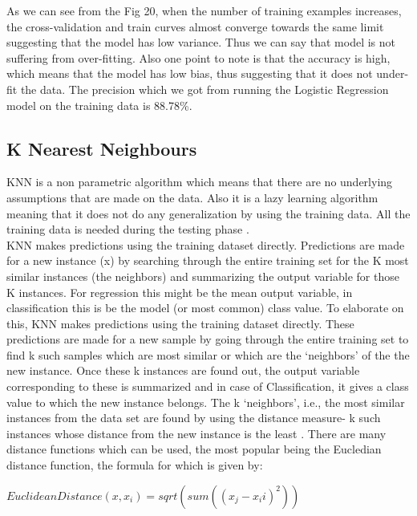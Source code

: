 As we can see from the Fig 20, when the number of training examples increases, the cross-validation and train curves almost converge towards the same limit suggesting that the model has low variance. Thus we can say that model is not suffering from over-fitting. Also one point to note is that the accuracy is high, which means that the model has low bias, thus suggesting that it does not under-fit the data. The precision which we got from running the Logistic Regression model on the training data is 88.78\%.

\subsection{K Nearest Neighbours}
KNN is a non parametric algorithm which means that there are no underlying assumptions that are made on the data. Also it is a lazy learning algorithm meaning that it does not do any generalization by using the training data. All the training data is needed during the testing phase \cite{link11}.\\
KNN makes predictions using the training dataset directly. Predictions are made for a new instance (x) by searching through the entire training set for the K most similar instances (the neighbors) and summarizing the output variable for those K instances. For regression this might be the mean output variable, in classification this is be the model (or most common) class value. To elaborate on this, KNN makes predictions using the training dataset directly. These predictions are made for a new sample by going through the entire training set to find k such samples which are most similar or which are the `neighbors' of the the new instance. Once these k instances are found out, the output variable corresponding to these is summarized and in case of Classification, it gives a class value to which the new instance belongs. The k `neighbors', i.e., the most similar instances from the data set are found by using the distance measure- k such instances whose distance from the new instance is the least \cite{link11}. There are many distance functions which can be used, the most popular being the Eucledian distance function, the formula for which is given by:

$EuclideanDistance(x, x_i) = sqrt( sum( (x_j-x_ii)^2 ) )$

